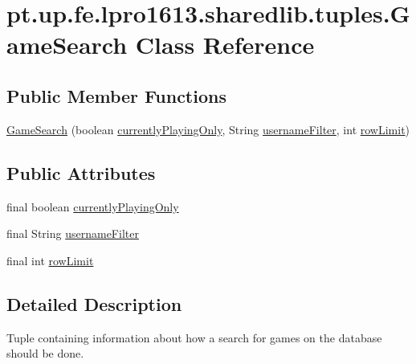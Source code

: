 \hypertarget{classpt_1_1up_1_1fe_1_1lpro1613_1_1sharedlib_1_1tuples_1_1_game_search}{}\section{pt.\+up.\+fe.\+lpro1613.\+sharedlib.\+tuples.\+Game\+Search Class Reference}
\label{classpt_1_1up_1_1fe_1_1lpro1613_1_1sharedlib_1_1tuples_1_1_game_search}
\subsection*{Public Member Functions}
\begin{DoxyCompactItemize}
\item 
\hyperlink{classpt_1_1up_1_1fe_1_1lpro1613_1_1sharedlib_1_1tuples_1_1_game_search_a471ebce85644752f9f34d86d69ed59c8}{Game\+Search} (boolean \hyperlink{classpt_1_1up_1_1fe_1_1lpro1613_1_1sharedlib_1_1tuples_1_1_game_search_a0a5922980b753f849b7a22cc8998034f}{currently\+Playing\+Only}, String \hyperlink{classpt_1_1up_1_1fe_1_1lpro1613_1_1sharedlib_1_1tuples_1_1_game_search_a11ad6852752acf4f5e607207aca305fa}{username\+Filter}, int \hyperlink{classpt_1_1up_1_1fe_1_1lpro1613_1_1sharedlib_1_1tuples_1_1_game_search_aca81e22172ef90ab183e08ba3a419773}{row\+Limit})
\end{DoxyCompactItemize}
\subsection*{Public Attributes}
\begin{DoxyCompactItemize}
\item 
final boolean \hyperlink{classpt_1_1up_1_1fe_1_1lpro1613_1_1sharedlib_1_1tuples_1_1_game_search_a0a5922980b753f849b7a22cc8998034f}{currently\+Playing\+Only}
\item 
final String \hyperlink{classpt_1_1up_1_1fe_1_1lpro1613_1_1sharedlib_1_1tuples_1_1_game_search_a11ad6852752acf4f5e607207aca305fa}{username\+Filter}
\item 
final int \hyperlink{classpt_1_1up_1_1fe_1_1lpro1613_1_1sharedlib_1_1tuples_1_1_game_search_aca81e22172ef90ab183e08ba3a419773}{row\+Limit}
\end{DoxyCompactItemize}


\subsection{Detailed Description}
Tuple containing information about how a search for games on the database should be done.

